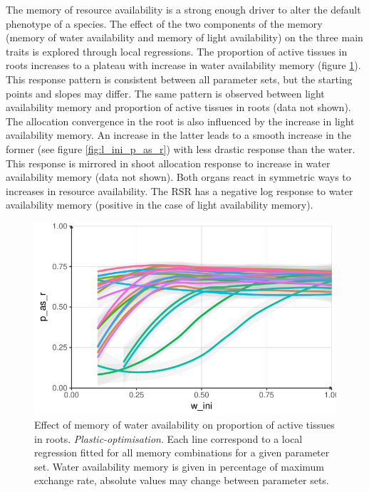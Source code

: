 The memory of resource availability is a strong enough driver to alter the default phenotype of a species. The effect of the two components of the memory (memory of water availability and memory of light availability) on the three main traits is explored through local regressions. The proportion of active tissues in roots increases to a plateau with increase in water availability memory (figure \ref{fig:w_ini_p_as_r}). This response pattern is consistent between all parameter sets, but the starting points and slopes may differ. The same pattern is observed between light availability memory and proportion of active tissues in roots (data not shown). The allocation convergence in the root is also influenced by the increase in light availability memory. An increase in the latter leads to a smooth increase in the former (see figure \ref{fig:l_ini_p_as_r}) with less drastic response than the water. This response is mirrored in shoot allocation response to increase in water availability memory (data not shown). Both organs react in symmetric ways to increases in resource availability. The RSR has a negative log response to water availability memory (positive in the case of light availability memory).

\begin{figure}\label{fig:w_ini_p_as_r}
\includegraphics[width = \textwidth]{./2_PP/Figures/Individual/w_ini_p_as_r.pdf}
\caption{Effect of memory of water availability on proportion of active tissues in roots. \textit{Plastic-optimisation}. Each line correspond to a local regression fitted for all memory combinations for a given parameter set. Water availability memory is given in percentage of maximum exchange rate, absolute values may change between parameter sets.}
\end{figure}


